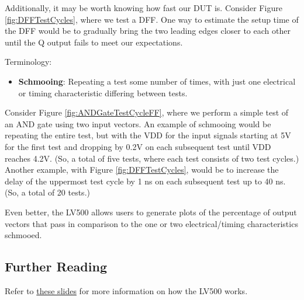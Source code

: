 Additionally, it may be worth knowing how fast our DUT is. Consider Figure \ref{fig:DFFTestCycles}, where we test a DFF. One way to estimate the setup time of the DFF would be to gradually bring the two leading edges closer to each other until the Q output fails to meet our expectations.

\begin{flushleft}
Terminology: 
\begin{itemize}
\item \textbf{Schmooing}: Repeating a test some number of times, with just one electrical or timing characteristic differing between tests.
\end{itemize}
\end{flushleft}

Consider Figure \ref{fig:ANDGateTestCycleFF}, where we perform a simple test of an AND gate using two input vectors. An example of schmooing would be repeating the entire test, but with the VDD for the input signals starting at 5V for the first test and dropping by 0.2V on each subsequent test until VDD reaches 4.2V. (So, a total of five tests, where each test consists of two test cycles.) Another example, with Figure \ref{fig:DFFTestCycles}, would be to increase the delay of the uppermost test cycle by 1 ns on each subsequent test up to 40 ns. (So, a total of 20 tests.)

Even better, the LV500 allows users to generate plots of the percentage of output vectors that pass in comparison to the one or two electrical/timing characteristics schmooed. 

\subsection{Further Reading}
Refer to \href{https://view.officeapps.live.com/op/view.aspx?src=http://www.ece.utah.edu/~kstevens/6712/tester.ppt}{these slides} for more information on how the LV500 works.

\newpage
